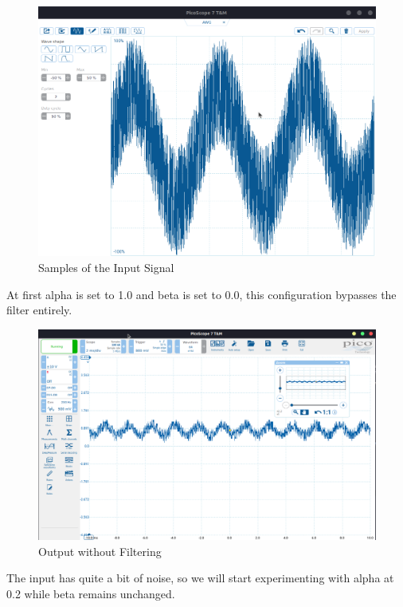 \begin{figure}[H]
    \centering
    \includegraphics[width=150mm, keepaspectratio]{figures/sine-with-error.png}
    \caption{Samples of the Input Signal}
    \label{fig:sine-with-error}
\end{figure}

At first alpha is set to 1.0 and beta is set to 0.0, this configuration bypasses the filter entirely.

\begin{figure}[H]
    \centering
    \includegraphics[width=150mm, keepaspectratio]{figures/bypass.png}
    \caption{Output without Filtering}
    \label{fig:bypass}
\end{figure}

The input has quite a bit of noise, so we will start experimenting with alpha at 0.2 while beta remains unchanged.


